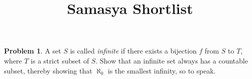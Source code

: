 \documentclass[10pt,a4paper,notitlepage]{article}
\title{\textrm{\textbf{\fontsize{30}{40}\selectfont Samasya Shortlist}}}
\date{%
    }
\theoremstyle{definition}
\newtheorem{prob}{Problem}
\begin{document}
\maketitle

\begin{prob}
  A set $S$ is called \emph{infinite} if there exists a bijection $f$ from $S$
  to $T$, where $T$ is a strict subset of $S$. Show that an infinite set always
  has a countable subset, thereby showing that $\aleph_0$ is the smallest
  infinity, so to speak.
\end{prob}

\end{document}
